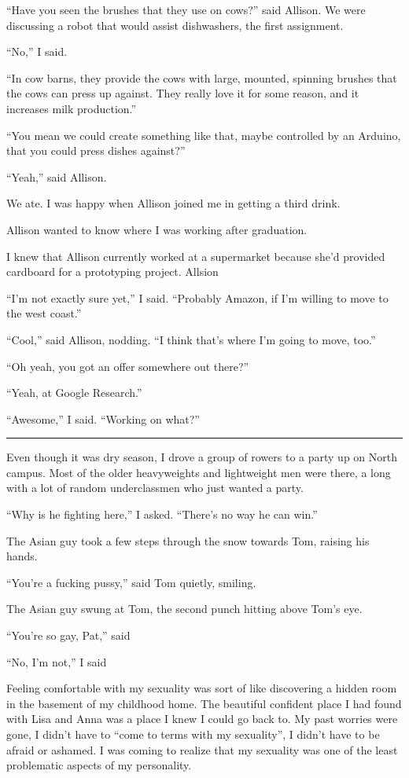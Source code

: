 ``Have you seen the brushes that they use on cows?'' said Allison.  We were
discussing a robot that would assist dishwashers, the first assignment.

``No,'' I said.

``In cow barns, they provide the cows with large, mounted, spinning brushes that
the cows can press up against.  They really love it for some reason, and it
increases milk production.''

``You mean we could create something like that, maybe controlled by an Arduino,
that you could press dishes against?''

``Yeah,'' said Allison.

We ate.  I was happy when Allison joined me in getting a third drink.

Allison wanted to know where I was working after graduation.

I knew that Allison currently worked at a supermarket because she'd provided
cardboard for a prototyping project.  Allsion 

``I'm not exactly sure yet,'' I said.  ``Probably Amazon, if I'm willing to move
to the west coast.''

``Cool,'' said Allison, nodding.  ``I think that's where I'm going to move,
too.''

``Oh yeah, you got an offer somewhere out there?''

``Yeah, at Google Research.''

``Awesome,'' I said.  ``Working on what?''

\plainfancybreak{12pt}{2}{* * *}

Even though it was dry season, I drove a group of rowers to a party up on North
campus.  Most of the older heavyweights and lightweight men were there, a long
with a lot of random underclassmen who just wanted a party.

``Why is he fighting here,'' I asked.  ``There's no way he can win.'' 

The Asian guy took a few steps through the snow towards Tom, raising his hands.

``You're a fucking pussy,'' said Tom quietly, smiling. 

The Asian guy swung at Tom, the second punch hitting above Tom's eye.

``You're so gay, Pat,'' said 

``No, I'm not,'' I said

Feeling comfortable with my sexuality was sort of like discovering a hidden room
in the basement of my childhood home.  The beautiful confident place I had found
with Lisa and Anna was a place I knew I could go back to.  My past worries were
gone, I didn't have to ``come to terms with my sexuality'', I didn't have to be
afraid or ashamed.  I was coming to realize that my sexuality was one of the
least problematic aspects of my personality.
 
